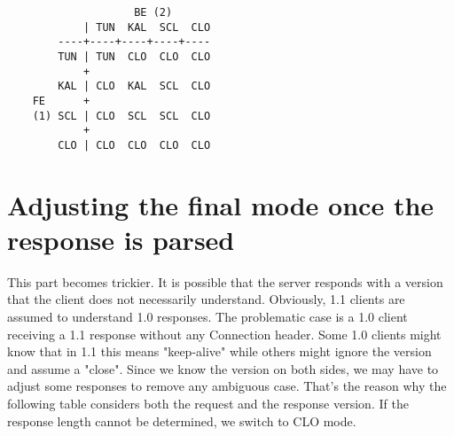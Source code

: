 \begin{verbatim}
                    BE (2)
            | TUN  KAL  SCL  CLO
        ----+----+----+----+----
        TUN | TUN  CLO  CLO  CLO
            +
        KAL | CLO  KAL  SCL  CLO
    FE      +
    (1) SCL | CLO  SCL  SCL  CLO
            +
        CLO | CLO  CLO  CLO  CLO
\end{verbatim}

\section{Adjusting the final mode once the response is parsed}

This part becomes trickier. It is possible that the server responds with a
version that the client does not necessarily understand. Obviously, 1.1 clients
are assumed to understand 1.0 responses. The problematic case is a 1.0 client
receiving a 1.1 response without any Connection header. Some 1.0 clients might
know that in 1.1 this means "keep-alive" while others might ignore the version
and assume a "close". Since we know the version on both sides, we may have to
adjust some responses to remove any ambiguous case. That's the reason why the
following table considers both the request and the response version. If the
response length cannot be determined, we switch to CLO mode.

